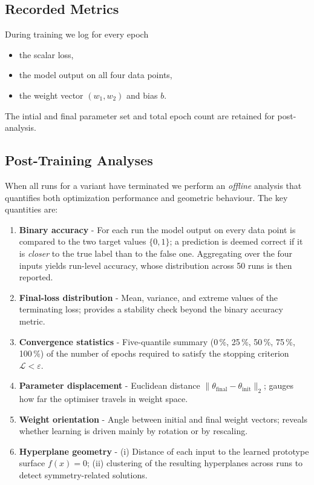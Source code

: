 \subsection*{Recorded Metrics}

During training we log for every epoch
\begin{itemize}
  \item the scalar loss,
  \item the model output on all four data points,
  \item the weight vector \((w_1,w_2)\) and bias \(b\).
\end{itemize}
The intial and final parameter set and total epoch count are retained for post-analysis.

\subsection*{Post-Training Analyses}

When all runs for a variant have terminated we perform an \emph{offline} analysis that quantifies both optimization performance and geometric behaviour.  The key quantities are:

\begin{enumerate}[label=(A\arabic*)]
    \item \textbf{Binary accuracy} -  
          For each run the model output on every data point is compared to the two target values \(\{0,1\}\); a prediction is deemed correct if it is \emph{closer} to the true label than to the false one. Aggregating over the four inputs yields run-level accuracy, whose distribution across 50 runs is then reported.
    \item \textbf{Final-loss distribution} -  
          Mean, variance, and extreme values of the terminating loss; provides a stability check beyond the binary accuracy metric.
    \item \textbf{Convergence statistics} -  
          Five-quantile summary (0\,\%, 25\,\%, 50\,\%, 75\,\%, 100\,\%) of the number of epochs required to satisfy the stopping criterion \(\mathcal{L}<\varepsilon\).
    \item \textbf{Parameter displacement} -  
          Euclidean distance \(\lVert\theta_{\text{final}}-\theta_{\text{init}}\rVert_2\); gauges how far the optimiser travels in weight space. 
    \item \textbf{Weight orientation} -  
          Angle between initial and final weight vectors; reveals whether learning is driven mainly by rotation or by rescaling.
    \item \textbf{Hyperplane geometry} -  
          (i) Distance of each input to the learned prototype surface \(f(x)=0\);  
          (ii) clustering of the resulting hyperplanes across runs to detect symmetry-related solutions.
\end{enumerate}


